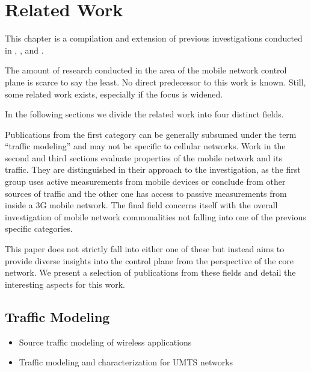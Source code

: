 \section{Related Work}
\label{c4:relwork}


This chapter is a compilation and extension of previous investigations conducted in \cite{metzger2012research}, \cite{metzger2014jcnc}, and \cite{metzger2014lossmodel}. 

The amount of research conducted in the area of the mobile network control plane is scarce to say the least. No direct predecessor to this work is known. Still, some related work exists, especially if the focus is widened.

In the following sections we divide the related work into four distinct fields.

Publications from the first category can be generally subsumed under the term ``traffic modeling'' and may not be specific to cellular networks. Work in the second and third sections evaluate properties of the mobile network and its traffic. They are distinguished in their approach to the investigation, as the first group uses active measurements from mobile devices or conclude from other sources of traffic and the other one has access to passive measurements from inside a \gls{3G} mobile network. The final field concerns itself with the overall investigation of mobile network commonalities not falling into one of the previous specific categories.

This paper does not strictly fall into either one of these but instead aims to provide diverse insights into the control plane from the perspective of the core network. We present a selection of publications from these fields and detail the interesting aspects for this work.







\subsection{Traffic Modeling}

\begin{itemize}
	\item Source traffic modeling of wireless applications \cite{staehle2000source}
	\item Traffic modeling and characterization for UMTS networks \cite{965876}
\end{itemize}

